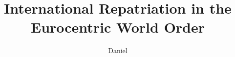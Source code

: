 \documentclass{../../../coursework}
\title{International Repatriation in the Eurocentric World Order}
\subtitle{}
\author{Daniel}{Glenn}{Leonard}
\date{\displaydate{date}}
\begin{document}
\maketitle

\nocite{*}
\printbibliography
\end{document}
